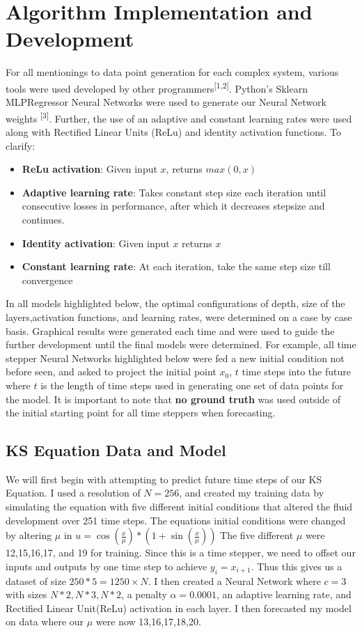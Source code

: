 \documentclass[12pt]{article}
\begin{document}
\section{Algorithm Implementation and Development}
For all mentionings to data point generation for each complex system, various tools were used developed by other programmers\textsuperscript{[1,2]}. Python's Sklearn MLPRegressor Neural Networks were used to generate our Neural Network weights \textsuperscript{[3]}. Further, the use of an adaptive and constant learning rates were used along with Rectified Linear Units (ReLu) and identity activation functions. To clarify:
\begin{itemize}
	\item \textbf{ReLu activation}: Given input $x$, returns $max(0,x)$
	\item \textbf{Adaptive learning rate}: Takes constant step size each iteration until consecutive losses in performance, after which it decreases stepsize and continues.
	\item \textbf{Identity activation}: Given input $x$ returns $x$
	\item \textbf{Constant learning rate}: At each iteration, take the same step size till convergence
\end{itemize}
In all models highlighted below, the optimal configurations of depth, size of the layers,activation functions, and learning rates, were determined on a case by case basis. Graphical results were generated each time and were used to guide the further development until the final models were determined. For example, all time stepper Neural Networks highlighted below were fed a new initial condition not before seen, and asked to project the initial point $x_0$, $t$ time steps into the future where $t$ is the length of time steps used in generating one set of data points for the model. It is important to note that \textbf{no ground truth} was used outside of the initial starting point for all time steppers when forecasting.

\subsection{KS Equation Data and Model}
We will first begin with attempting to predict future time steps of our KS Equation. I used a resolution of $N=256$, and created my training data by simulating the equation with five different initial conditions that altered the fluid development over 251 time steps. The equations initial conditions were changed by altering $\mu$ in $u = \cos(\frac{x}{\mu})*(1+\sin(\frac{x}{\mu}))$ The five different $\mu$ were 12,15,16,17, and 19 for training. Since this is a time stepper, we need to offset our inputs and outputs by one time step to achieve $y_i = x_{i+1}$. Thus this gives us a dataset of size $250*5=1250\times N$. I then created a Neural Network where $c=3$ with sizes ${N*2,N*3,N*2}$, a penalty $\alpha = 0.0001$, an adaptive learning rate, and Rectified Linear Unit(ReLu) activation in each layer. I then forecasted my model on data where our $\mu$ were now 13,16,17,18,20.
\end{document}
